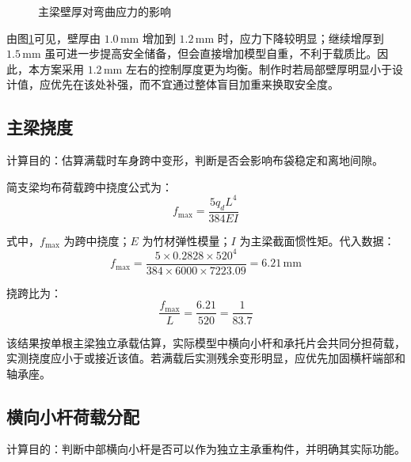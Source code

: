 \documentclass[UTF8,a4paper,12pt,fontset=none]{ctexart}
\numberwithin{equation}{section}
\numberwithin{figure}{section}
\numberwithin{table}{section}
\newcommand{\mm}{\,\mathrm{mm}}
\begin{document}
\begin{figure}[H]
\centering
{}
\caption{主梁壁厚对弯曲应力的影响}
\label{fig:thickness-sensitivity}
\end{figure}

由图\ref{fig:thickness-sensitivity}可见，壁厚由 $1.0\mm$ 增加到 $1.2\mm$ 时，应力下降较明显；继续增厚到 $1.5\mm$ 虽可进一步提高安全储备，但会直接增加模型自重，不利于载质比。因此，本方案采用 $1.2\mm$ 左右的控制厚度更为均衡。制作时若局部壁厚明显小于设计值，应优先在该处补强，而不宜通过整体盲目加重来换取安全度。

\subsection{主梁挠度}
计算目的：估算满载时车身跨中变形，判断是否会影响布袋稳定和离地间隙。

简支梁均布荷载跨中挠度公式为：
\begin{equation}
  f_{\max}=\frac{5q_dL^4}{384EI}
\end{equation}

式中，$f_{\max}$ 为跨中挠度；$E$ 为竹材弹性模量；$I$ 为主梁截面惯性矩。代入数据：
\begin{equation}
  f_{\max}=\frac{5\times0.2828\times520^4}{384\times6000\times7223.09}=6.21\mm
\end{equation}

挠跨比为：
\begin{equation}
  \frac{f_{\max}}{L}=\frac{6.21}{520}=\frac{1}{83.7}
\end{equation}

该结果按单根主梁独立承载估算，实际模型中横向小杆和承托片会共同分担荷载，实测挠度应小于或接近该值。若满载后实测残余变形明显，应优先加固横杆端部和轴承座。

\subsection{横向小杆荷载分配}
计算目的：判断中部横向小杆是否可以作为独立主承重构件，并明确其实际功能。
\end{document}
